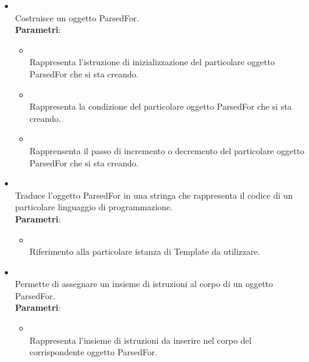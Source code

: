 \begin{itemize}
\begin{itemize}
\item {}
\\ Costruisce un oggetto ParsedFor.
\\ \textbf{Parametri}:
\begin{itemize}
\item {}
\\ Rappresenta l'istruzione di inizializzazione del particolare oggetto ParsedFor che si sta creando.
\item {}
\\ Rappresenta la condizione del particolare oggetto ParsedFor che si sta creando.

\item {}
\\ Rapprensenta il passo di incremento o decremento del particolare oggetto ParsedFor che si sta creando.
\end{itemize}
\item {}
\\ Traduce l'oggetto ParsedFor in una stringa che rappresenta il codice di un particolare linguaggio di programmazione.
\\ \textbf{Parametri}:
\begin{itemize}
\item {}
\\ Riferimento alla particolare istanza di Template da utilizzare.
\end{itemize}
\item {}
\\ Permette di assegnare un insieme di istruzioni al corpo di un oggetto ParsedFor.
\\ \textbf{Parametri}:
\begin{itemize}
\item {}
\\ Rappresenta l'insieme di istruzioni da inserire nel corpo del corrispondente oggetto ParsedFor.
\end{itemize}
\end{itemize}
\end{itemize}

